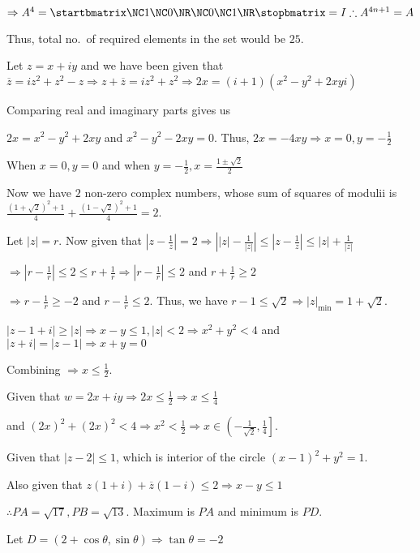   $\Rightarrow A^4 = \startbmatrix\NC1\NC 0\NR\NC 0\NC 1\NR\stopbmatrix = I \therefore A^{4n + 1} = A$

  Thus, total no.\  of required elements in the set would be $25$.
\item Let $z = x + iy$ and we have been given that $\overline{z} = iz^2 + z^2 - z \Rightarrow z
  + \overline{z} = iz^2 + z^2\Rightarrow 2x = (i + 1)(x^2 - y^2 + 2xyi)$

  Comparing real and imaginary parts gives us

  $2x = x^2 - y^2 + 2xy$ and $x^2 - y^2 - 2xy = 0$. Thus, $2x = -4xy \Rightarrow x = 0, y = -\frac{1}{2}$

  When $x = 0, y = 0$ and when $y = -\frac{1}{2}, x= \frac{1\pm\sqrt{2}}{2}$

  Now we have $2$ non-zero complex numbers, whose sum of squares of modulii is $\frac{(1 + \sqrt{2})^2 +
    1}{4} + \frac{(1 - \sqrt{2})^2 + 1}{4} = 2$.
\item Let $|z| = r$. Now given that $\left|z - \frac{1}{z}\right| = 2 \Rightarrow \left||z|
  - \frac{1}{|z|}\right|\leq \left|z - \frac{1}{z}\right|\leq |z| + \frac{1}{|z|}$

  $\Rightarrow \left|r - \frac{1}{r}\right|\leq 2\leq r + \frac{1}{r}\Rightarrow \left|r
  - \frac{1}{r}\right|\leq 2$ and $r + \frac{1}{r}\geq 2$

  $\Rightarrow r - \frac{1}{r}\geq -2$ and $r - \frac{1}{r}\leq 2$. Thus, we have $r -
  1\leq \sqrt{2} \Rightarrow |z|_{\min} = 1 + \sqrt{2}$.
\item $|z - 1 + i| \geq |z| \Rightarrow x - y \leq 1, |z| < 2 \Rightarrow x^2 + y^2 < 4$ and $|z + i| = |z -
  1| \Rightarrow x + y = 0$

  Combining $\Rightarrow x \leq \frac{1}{2}$.

  Given that $w = 2x + iy\Rightarrow 2x\leq \frac{1}{2}\Rightarrow x\leq \frac{1}{4}$

  and $(2x)^2 + (2x)^2 < 4\Rightarrow x^2 < \frac{1}{2}\Rightarrow
  x\in\left(-\frac{1}{\sqrt{2}}, \frac{1}{4}\right]$.
\item   Given that $|z - 2|\leq 1$, which is interior of the circle $(x - 1)^2 + y^2 = 1$.

  Also given that $z(1 + i) + \overline{z}(1 - i)\leq 2 \Rightarrow x - y\leq 1$

  $\therefore PA  = \sqrt{17}, PB = \sqrt{13}$. Maximum is $PA$ and minimum is $PD$.

  Let $D = (2 + \cos\theta, \sin\theta) \Rightarrow \tan\theta = -2$

